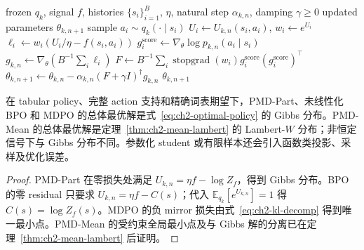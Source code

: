 \documentclass[lang=cn,scheme=chinese,openany]{../book/elegantbook}
\begin{document}
\begin{algorithm}[ht]
\caption{MDPO natural-gradient inner update\\{\small\textit{Semantics: 最小化固定 history 的负 mirror objective}}}
\begin{algorithmic}[1]
\Require frozen $ q_k$, signal $f$, histories $\{s_i\}_{i=1}^{B}$, $\eta$, natural step $\alpha_{k,n}$, damping $\gamma\ge0$
\Ensure updated parameters $\theta_{k,n+1}$
    \State sample $a_i\sim q_k(\cdot\mid s_i)$
    \State $U_i\gets U_{k,n}(s_i,a_i)$, $w_i\gets e^{U_i}$
    \State $\ell_i\gets w_i(U_i/\eta-f(s_i,a_i))$ 
    \State $g_i^{\mathrm{score}}\gets\nabla_\theta\log p_{k,n}(a_i\mid s_i)$
\EndFor
\State $g_{k,n}\gets\nabla_\theta(B^{-1}\sum_i\ell_i)$
\State $F\gets B^{-1}\sum_i\operatorname{stopgrad}(w_i)g_i^{\mathrm{score}}(g_i^{\mathrm{score}})^\top$
\State $\theta_{k,n+1}\gets\theta_{k,n}-\alpha_{k,n}(F+\gamma I)^\dagger g_{k,n}$
\State \Return $\theta_{k,n+1}$
\end{algorithmic}
\end{algorithm}

\begin{theorem}
\label{thm:ch2-inner-common-root}
在 tabular policy、完整 action 支持和精确词表期望下，PMD-Part、未线性化 BPO 和 MDPO 的总体最优解是式~\eqref{eq:ch2-optimal-policy} 的 Gibbs 分布。PMD-Mean 的总体最优解是定理~\ref{thm:ch2-mean-lambert} 的 Lambert-$W$ 分布；非恒定信号下与 Gibbs 分布不同。参数化 student 或有限样本还会引入函数类投影、采样及优化误差。
\end{theorem}

\begin{proof}
PMD-Part 在零损失处满足 $U_{k,n}=\eta f-\log Z_f$，得到 Gibbs 分布。BPO 的零 residual 只要求 $U_{k,n}=\eta f-C(s)$；代入 $\mathbb E_{ q_k}[e^{U_{k,n}}]=1$ 得 $C(s)=\log Z_f(s)$。MDPO 的负 mirror 损失由式~\eqref{eq:ch2-kl-decomp} 得到唯一最小点。PMD-Mean 的受约束全局最小点及与 Gibbs 解的分离已在定理~\ref{thm:ch2-mean-lambert} 后证明。
\end{proof}
\end{document}
